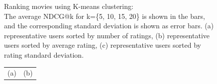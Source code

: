 \begin{figure}
{\begin{tabular}{ c c c}
\end{tabular}
}
\caption{Ranking movies using K-means clustering: 
\\The average NDCG@k for k=\{5, 10, 15, 20\} is shown in the bars, and the corresponding standard deviation is shown as error bars. (a) representative users sorted by number of ratings, (b) representative users sorted by average rating, (c) representative users sorted by rating standard deviation. }
\label{fig:ndcg}  
\end{figure}



\begin{figure}[t]
\begin{tabular}{ l l}
  \hspace{3.5cm}(a) & \hspace{7cm}(b)\\
\end{tabular}\\
\end{figure}
